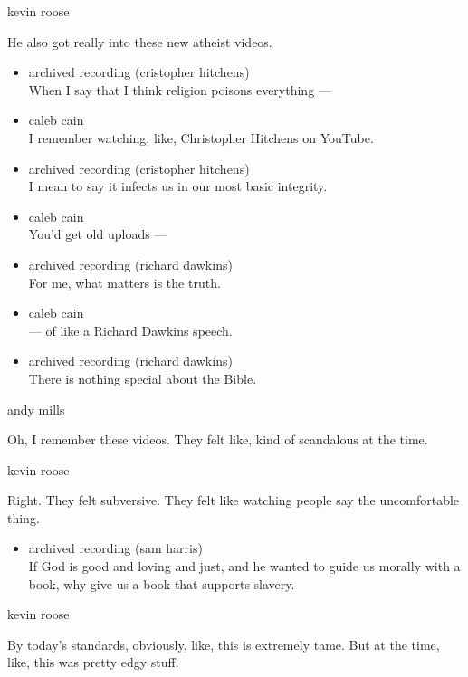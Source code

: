 kevin roose

He also got really into these new atheist videos.

\begin{itemize}
\item
  archived recording (cristopher hitchens)\\
  When I say that I think religion poisons everything ---
\item
  caleb cain\\
  I remember watching, like, Christopher Hitchens on YouTube.
\item
  archived recording (cristopher hitchens)\\
  I mean to say it infects us in our most basic integrity.
\item
  caleb cain\\
  You'd get old uploads ---
\item
  archived recording (richard dawkins)\\
  For me, what matters is the truth.
\item
  caleb cain\\
  --- of like a Richard Dawkins speech.
\item
  archived recording (richard dawkins)\\
  There is nothing special about the Bible.
\end{itemize}

andy mills

Oh, I remember these videos. They felt like, kind of scandalous at the
time.

kevin roose

Right. They felt subversive. They felt like watching people say the
uncomfortable thing.

\begin{itemize}
\tightlist
\item
  archived recording (sam harris)\\
  If God is good and loving and just, and he wanted to guide us morally
  with a book, why give us a book that supports slavery.
\end{itemize}

kevin roose

By today's standards, obviously, like, this is extremely tame. But at
the time, like, this was pretty edgy stuff.

